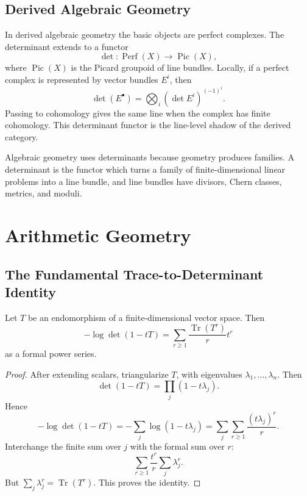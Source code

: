 \documentclass[11pt]{memoir}
\providecommand{\Perf}{\operatorname{Perf}}
\providecommand{\Pic}{\operatorname{Pic}}
\providecommand{\Tr}{\operatorname{Tr}}
\begin{document}
\section{Derived Algebraic Geometry}
\label{sec:derived-ag-det}

In derived algebraic geometry the basic objects are perfect complexes.
The determinant extends to a functor
\[
  \det:\Perf(X)\to \Pic(X),
\]
where \(\Pic(X)\) is the Picard groupoid of line bundles. Locally, if
a perfect complex is represented by vector bundles \(E^i\), then
\[
  \det(E^\bullet)=\bigotimes_i(\det E^i)^{(-1)^i}.
\]
Passing to cohomology gives the same line when the complex has finite
cohomology. This determinant functor is the line-level shadow of the
derived category.

Algebraic geometry uses determinants because geometry produces
families. A determinant is the functor which turns a family of
finite-dimensional linear problems into a line bundle, and line
bundles have divisors, Chern classes, metrics, and moduli.

\chapter{Arithmetic Geometry}
\label{ch:arithmetic-geometry}

\section{The Fundamental Trace-to-Determinant Identity}
\label{sec:trace-det-identity}

\begin{proposition}
\label{prop:trace-det-identity}
Let \(T\) be an endomorphism of a finite-dimensional vector space.
Then
\[
  -\log\det(1-tT)
  =
  \sum_{r\geq1}\frac{\Tr(T^r)}{r}t^r
\]
as a formal power series.
\end{proposition}

\begin{proof}
After extending scalars, triangularize \(T\), with eigenvalues
\(\lambda_1,\dots,\lambda_n\). Then
\[
  \det(1-tT)=\prod_j(1-t\lambda_j).
\]
Hence
\[
  -\log\det(1-tT)
  =
  -\sum_j\log(1-t\lambda_j)
  =
  \sum_j\sum_{r\geq1}\frac{(t\lambda_j)^r}{r}.
\]
Interchange the finite sum over \(j\) with the formal sum over \(r\):
\[
  \sum_{r\geq1}\frac{t^r}{r}\sum_j\lambda_j^r.
\]
But \(\sum_j\lambda_j^r=\Tr(T^r)\). This proves the identity.
\end{proof}
\end{document}
